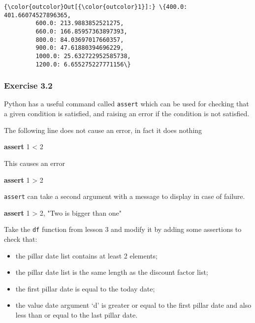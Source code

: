 \documentclass[11pt]{article}
\providecommand{\tightlist}{%
      \setlength{\itemsep}{0pt}\setlength{\parskip}{0pt}}
\newenvironment{Shaded}{}{}
\newcommand{\DecValTok}[1]{\textcolor[rgb]{0.25,0.63,0.44}{{#1}}}
\newcommand{\StringTok}[1]{\textcolor[rgb]{0.25,0.44,0.63}{{#1}}}
\newcommand{\NormalTok}[1]{{#1}}
\newcommand{\ControlFlowTok}[1]{\textcolor[rgb]{0.00,0.44,0.13}{\textbf{{#1}}}}
\newcommand{\OperatorTok}[1]{\textcolor[rgb]{0.40,0.40,0.40}{{#1}}}
\begin{document}
\begin{Verbatim}[commandchars=\\\{\}]
{\color{outcolor}Out[{\color{outcolor}1}]:} \{400.0: 401.66074527896365,
         600.0: 213.9883852521275,
         660.0: 166.85957363897393,
         800.0: 84.03697017660357,
         900.0: 47.61880394696229,
         1000.0: 25.632722952585738,
         1200.0: 6.655275227771156\}
\end{Verbatim}
            
    \hypertarget{exercise-3.2}{%
\subsubsection{Exercise 3.2}\label{exercise-3.2}}

Python has a useful command called \texttt{assert} which can be used for
checking that a given condition is satisfied, and raising an error if
the condition is not satisfied.

The following line does not cause an error, in fact it does nothing

\begin{Shaded}
\begin{Highlighting}[]
\ControlFlowTok{assert} \DecValTok{1} \OperatorTok{<} \DecValTok{2}
\end{Highlighting}
\end{Shaded}

This causes an error

\begin{Shaded}
\begin{Highlighting}[]
\ControlFlowTok{assert} \DecValTok{1} \OperatorTok{>} \DecValTok{2}
\end{Highlighting}
\end{Shaded}

\texttt{assert} can take a second argument with a message to display in
case of failure.

\begin{Shaded}
\begin{Highlighting}[]
\ControlFlowTok{assert} \DecValTok{1} \OperatorTok{>} \DecValTok{2}\NormalTok{, }\StringTok{"Two is bigger than one"}
\end{Highlighting}
\end{Shaded}

Take the \texttt{df} function from lesson 3 and modify it by adding some
assertions to check that:

\begin{itemize}
\tightlist
\item
  the pillar date list contains at least 2 elements;
\item
  the pillar date list is the same length as the discount factor list;
\item
  the first pillar date is equal to the today date;
\item
  the value date argument `d' is greater or equal to the first pillar
  date and also less than or equal to the last pillar date.
\end{itemize}
\end{document}
